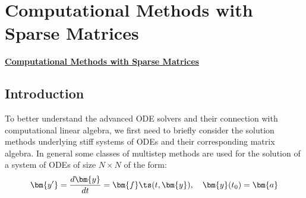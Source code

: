 \chapter{Computational Methods with Sparse Matrices}
\label{chap:sparseMatrix}
{
	\hypersetup{linkcolor=black}
	\minitoc
}
\clearpage 



\underline{\textbf{Computational Methods with Sparse Matrices}}

\section{Introduction}

To better understand the advanced ODE solvers and their connection with
computational linear algebra, we first need to briefly consider the solution
methods underlying stiff systems of ODEs and their corresponding matrix algebra.
In general some classes of multistep methods are used for the solution of a
system of ODEs of size $N \times N$ of the form:
\begin{equation}\label{E:linde}
    \bm{y'}= \frac{d{\bm{y}}}{dt} = {\bm {f}}\ts (t,{\bm{y}}), \quad {\bm{y}}(t_0)= {\bm {a}}
\end{equation}

